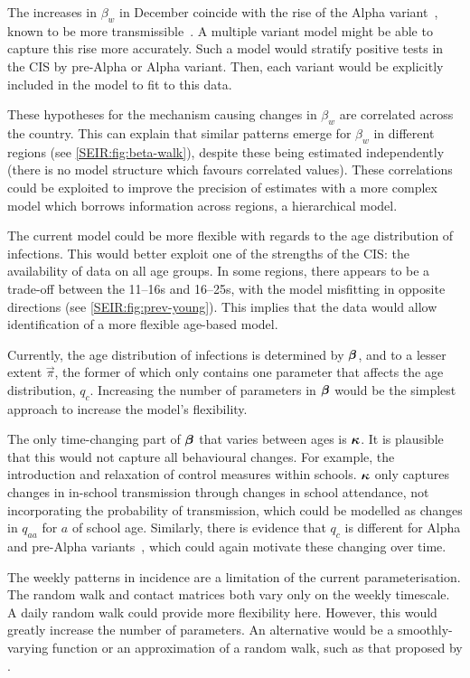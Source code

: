 \documentclass[thesis.tex]{subfiles}
\begin{document}
The increases in $\beta_w$ in December coincide with the rise of the Alpha variant~\autocite{lythgoeLineage}, known to be more transmissible~\autocite[e.g.][]{daviesEstimated}.
A multiple variant model might be able to capture this rise more accurately.
Such a model would stratify positive tests in the CIS by pre-Alpha or Alpha variant.
Then, each variant would be explicitly included in the model to fit to this data.

These hypotheses for the mechanism causing changes in $\beta_w$ are correlated across the country.
This can explain that similar patterns emerge for $\beta_w$ in different regions (see \cref{SEIR:fig:beta-walk}), despite these being estimated independently (\ie there is no model structure which favours correlated values).
These correlations could be exploited to improve the precision of estimates with a more complex model which borrows information across regions, \eg a hierarchical model.

The current model could be more flexible with regards to the age distribution of infections.
This would better exploit one of the strengths of the CIS: the availability of data  on all age groups.
In some regions, there appears to be a trade-off between the 11--16s and 16--25s, with the model misfitting in opposite directions (see \cref{SEIR:fig:prev-young}).
This implies that the data would allow identification of a more flexible age-based model.

Currently, the age distribution of infections is determined by $\bm{\beta}$, and to a lesser extent $\vec{\pi}$, the former of which only contains one parameter that affects the age distribution, $q_c$.
Increasing the number of parameters in $\bm{\beta}$ would be the simplest approach to increase the model's flexibility.

The only time-changing part of $\bm{\beta}$ that varies between ages is $\bm{\kappa}$.
It is plausible that this would not capture all behavioural changes.
For example, the introduction and relaxation of control measures within schools.
$\bm{\kappa}$ only captures changes in in-school transmission through changes in school attendance, not incorporating the probability of transmission, which could be modelled as changes in $q_{aa}$ for $a$ of school age.
Similarly, there is evidence that $q_c$ is different for Alpha and pre-Alpha variants~\autocite{zhuRole}, which could again motivate these changing over time.

The weekly patterns in incidence are a limitation of the current parameterisation.
The random walk and contact matrices both vary only on the weekly timescale.
A daily random walk could provide more flexibility here.
However, this would greatly increase the number of parameters.
An alternative would be a smoothly-varying function or an approximation of a random walk, such as that proposed by \textcite{ghoshApproximate}.
\end{document}
